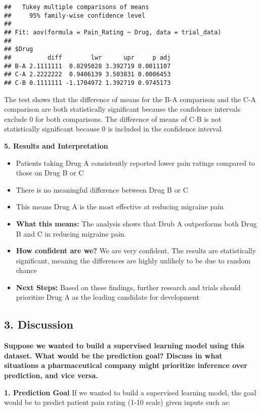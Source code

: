 \documentclass[
]{article}
\providecommand{\tightlist}{%
  \setlength{\itemsep}{0pt}\setlength{\parskip}{0pt}}
\begin{document}
\begin{verbatim}
##   Tukey multiple comparisons of means
##     95% family-wise confidence level
## 
## Fit: aov(formula = Pain_Rating ~ Drug, data = trial_data)
## 
## $Drug
##          diff        lwr      upr     p adj
## B-A 2.1111111  0.8295028 3.392719 0.0011107
## C-A 2.2222222  0.9406139 3.503831 0.0006453
## C-B 0.1111111 -1.1704972 1.392719 0.9745173
\end{verbatim}

The test shows that the difference of means for the B-A comparison and
the C-A comparison are both statistically significant because the
confidence intervals exclude 0 for both comparisons. The difference of
means of C-B is not statistically significant because 0 is included in
the confidence interval.

\textbf{5. Results and Interpretation}

\begin{itemize}
\tightlist
\item
  Patients taking Drug A consistently reported lower pain ratings
  compared to those on Drug B or C
\item
  There is no meaningful difference between Drug B or C
\item
  This means Drug A is the most effective at reducing migraine pain
\item
  \textbf{What this means:} The analysis shows that Drub A outperforms
  both Drug B and C in reducing migraine pain.
\item
  \textbf{How confident are we?} We are very confident. The results are
  statistically significant, meaning the differences are highly unlikely
  to be due to random chance
\item
  \textbf{Next Steps:} Based on these findings, further research and
  trials should prioritize Drug A as the leading candidate for
  development
\end{itemize}

\subsection{3. Discussion}\label{discussion}

\textbf{Suppose we wanted to build a supervised learning model using
this dataset. What would be the prediction goal? Discuss in what
situations a pharmaceutical company might prioritize inference over
prediction, and vice versa.}

\textbf{1. Prediction Goal} If we wanted to build a supervised learning
model, the goal would be to predict patient pain rating (1-10 scale)
given inputs such as:
\end{document}

